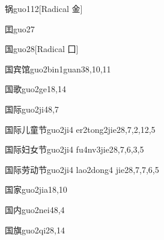 \begin{entry}{锅}{guo1}{12}[Radical 金]
\end{entry}

\begin{entry}{囯}{guo2}{7}
\end{entry}

\begin{entry}{国}{guo2}{8}[Radical ⼞]
\end{entry}

\begin{entry}{国宾馆}{guo2bin1guan3}{8,10,11}
\end{entry}

\begin{entry}{国歌}{guo2ge1}{8,14}
\end{entry}

\begin{entry}{国际}{guo2ji4}{8,7}
\end{entry}

\begin{entry}{国际儿童节}{guo2ji4 er2tong2jie2}{8,7,2,12,5}
\end{entry}

\begin{entry}{国际妇女节}{guo2ji4 fu4nv3jie2}{8,7,6,3,5}
\end{entry}

\begin{entry}{国际劳动节}{guo2ji4 lao2dong4 jie2}{8,7,7,6,5}
\end{entry}

\begin{entry}{国家}{guo2jia1}{8,10}
\end{entry}

\begin{entry}{国内}{guo2nei4}{8,4}
\end{entry}

\begin{entry}{国旗}{guo2qi2}{8,14}
\end{entry}

